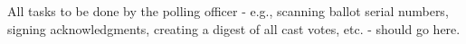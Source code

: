 All tasks to be done by the polling officer -\/ e.\+g., scanning ballot serial numbers, signing acknowledgments, creating a digest of all cast votes, etc. -\/ should go here. 